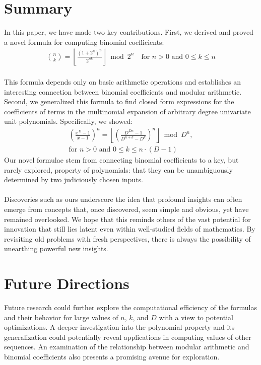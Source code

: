 \documentclass{article}
\theoremstyle{plain}
\theoremstyle{definition}
\begin{document}
\section{Summary}
In this paper, we have made two key contributions. First, we derived and proved a novel formula for computing binomial coefficients:
\begin{align*}
\binom{n}{k} = \left\lfloor\frac{(1 + 2^{n})^{n}}{2^{n k}}\right\rfloor \bmod{2^{n}} \quad \text{for } n > 0 \text{ and } 0 \leq k \leq n
\end{align*}
\\
This formula depends only on basic arithmetic operations and establishes an interesting connection between binomial coefficients and modular arithmetic. 
\\
Second, we generalized this formula to find closed form expressions for the coefficients of terms in the multinomial expansion of arbitrary degree univariate unit polynomials. Specifically, we showed:
\begin{align*}
[x^k] \left(\frac{x^{D}-1}{x-1}\right)^n = \left\lfloor \left(\frac{D^{Dn} - 1}{D^{n+k} - D^k}\right)^n\right\rfloor \bmod D^n, \\ \text{for } n > 0 \text{ and } 0 \leq k \leq n \cdot (D-1)
\end{align*}
Our novel formulae stem from connecting binomial coefficients to a key, but rarely explored, property of polynomials: that they can be unambiguously determined by two judiciously chosen inputs.
\\
\\
Discoveries such as ours underscore the idea that profound insights can often emerge from concepts that, once discovered, seem simple and obvious, yet have remained overlooked. We hope that this reminds others of the vast potential for innovation that still lies latent even within well-studied fields of mathematics. By revisiting old problems with fresh perspectives, there is always the possibility of unearthing powerful new insights.

\section{Future Directions}
Future research could further explore the computational efficiency of the formulas and their behavior for large values of \(n\), \(k\), and \(D\) with a view to potential optimizations. A deeper investigation into the polynomial property and its generalization could potentially reveal applications in computing values of other sequences. An examination of the relationship between modular arithmetic and binomial coefficients also presents a promising avenue for exploration.



\end{document}
